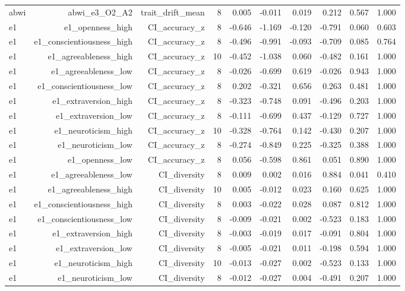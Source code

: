 \documentclass[11pt]{article}
\begin{document}
\begin{landscape}
\begin{longtable}{@{}lrrrrrrrrr@{}}
abwi & abwi\_e3\_O2\_A2 & trait\_drift\_mean & 8 & 0.005 & -0.011 & 0.019 & 0.212 & 0.567 & 1.000 \\
e1 & e1\_openness\_high & CI\_accuracy\_z & 8 & -0.646 & -1.169 & -0.120 & -0.791 & 0.060 & 0.603 \\
e1 & e1\_conscientiousness\_high & CI\_accuracy\_z & 8 & -0.496 & -0.991 & -0.093 & -0.709 & 0.085 & 0.764 \\
e1 & e1\_agreeableness\_high & CI\_accuracy\_z & 10 & -0.452 & -1.038 & 0.060 & -0.482 & 0.161 & 1.000 \\
e1 & e1\_agreeableness\_low & CI\_accuracy\_z & 8 & -0.026 & -0.699 & 0.619 & -0.026 & 0.943 & 1.000 \\
e1 & e1\_conscientiousness\_low & CI\_accuracy\_z & 8 & 0.202 & -0.321 & 0.656 & 0.263 & 0.481 & 1.000 \\
e1 & e1\_extraversion\_high & CI\_accuracy\_z & 8 & -0.323 & -0.748 & 0.091 & -0.496 & 0.203 & 1.000 \\
e1 & e1\_extraversion\_low & CI\_accuracy\_z & 8 & -0.111 & -0.699 & 0.437 & -0.129 & 0.727 & 1.000 \\
e1 & e1\_neuroticism\_high & CI\_accuracy\_z & 10 & -0.328 & -0.764 & 0.142 & -0.430 & 0.207 & 1.000 \\
e1 & e1\_neuroticism\_low & CI\_accuracy\_z & 8 & -0.274 & -0.849 & 0.225 & -0.325 & 0.388 & 1.000 \\
e1 & e1\_openness\_low & CI\_accuracy\_z & 8 & 0.056 & -0.598 & 0.861 & 0.051 & 0.890 & 1.000 \\
e1 & e1\_agreeableness\_low & CI\_diversity & 8 & 0.009 & 0.002 & 0.016 & 0.884 & 0.041 & 0.410 \\
e1 & e1\_agreeableness\_high & CI\_diversity & 10 & 0.005 & -0.012 & 0.023 & 0.160 & 0.625 & 1.000 \\
e1 & e1\_conscientiousness\_high & CI\_diversity & 8 & 0.003 & -0.022 & 0.028 & 0.087 & 0.812 & 1.000 \\
e1 & e1\_conscientiousness\_low & CI\_diversity & 8 & -0.009 & -0.021 & 0.002 & -0.523 & 0.183 & 1.000 \\
e1 & e1\_extraversion\_high & CI\_diversity & 8 & -0.003 & -0.019 & 0.017 & -0.091 & 0.804 & 1.000 \\
e1 & e1\_extraversion\_low & CI\_diversity & 8 & -0.005 & -0.021 & 0.011 & -0.198 & 0.594 & 1.000 \\
e1 & e1\_neuroticism\_high & CI\_diversity & 10 & -0.013 & -0.027 & 0.002 & -0.523 & 0.133 & 1.000 \\
e1 & e1\_neuroticism\_low & CI\_diversity & 8 & -0.012 & -0.027 & 0.004 & -0.491 & 0.207 & 1.000 \\

\end{longtable}
\end{landscape}
\end{document}
